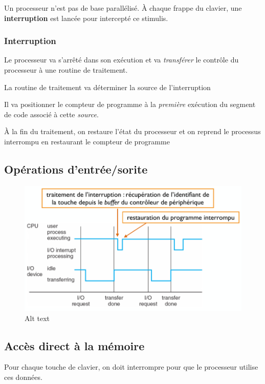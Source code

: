 Un processeur n'est pas de base parallélisé. À chaque frappe du clavier,
une \textbf{interruption} est lancée pour intercepté ce stimulis.

\subsubsection{Interruption}\label{interruption}

Le processeur va s'arrêté dans son exécution et va \emph{transférer} le
contrôle du processeur à une routine de traitement.

La routine de traitement va déterminer la source de l'interruption

Il va positionner le compteur de programme à la \emph{première}
exécution du segment de code associé à cette \emph{source}.

À la fin du traitement, on restaure l'état du processeur et on reprend
le processus interrompu en restaurant le compteur de programme

\subsection{Opérations
d'entrée/sorite}\label{opuxe9rations-dentruxe9esorite}

\begin{figure}
\centering
\includegraphics{image.png}
\caption{Alt text}
\end{figure}

\subsection{Accès direct à la
mémoire}\label{accuxe8s-direct-uxe0-la-muxe9moire}

Pour chaque touche de clavier, on doit interrompre pour que le
processeur utilise ces données.

